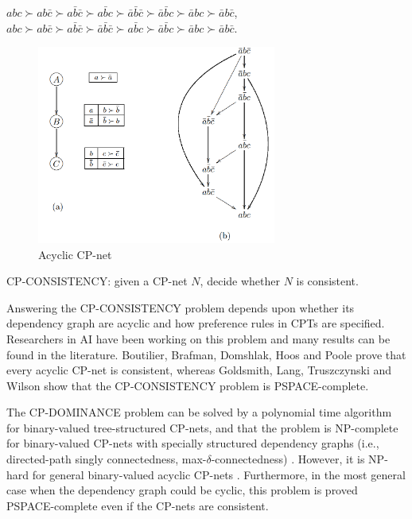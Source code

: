 \begin{center}
	$abc \succ ab\bar{c} \succ a\bar{b}\bar{c} \succ a\bar{b}c \succ \bar{a}\bar{b}\bar{c} 
		\succ \bar{a}\bar{b}c \succ \bar{a}bc \succ \bar{a}b\bar{c}$,\\
	$abc \succ ab\bar{c} \succ a\bar{b}\bar{c} \succ \bar{a}\bar{b}\bar{c} \succ a\bar{b}c
		\succ \bar{a}\bar{b}c \succ \bar{a}bc \succ \bar{a}b\bar{c}$.
\end{center}

\begin{figure}[h!]
  \centering
  \includegraphics[width=0.7\textwidth]{img/acpn.png}
  \caption{Acyclic CP-net \label{fig:cp_net}}
\end{figure}



\begin{definition}
\label{def:con}
  CP-CONSISTENCY: given a CP-net $N$, decide whether 
	$N$ is consistent.
\end{definition}

Answering the CP-CONSISTENCY problem depends upon whether
its dependency graph are acyclic and how preference rules
in CPTs are specified.
Researchers in AI have been working on this problem
and many results can be found in the literature.
Boutilier, Brafman, Domshlak, Hoos and Poole \cite{bbdh03} 
prove that every acyclic CP-net
is consistent, whereas Goldsmith, Lang, Truszczynski and Wilson \cite{Goldsmith} show
that the CP-CONSISTENCY problem is PSPACE-complete.



The CP-DOMINANCE problem can be solved by
a polynomial time algorithm for binary-valued tree-structured
CP-nets, and that the problem is NP-complete for binary-valued
CP-nets with specially structured dependency graphs 
(i.e., directed-path singly connectedness, 
max-$\delta$-connectedness) \cite{bbdh03}.
However, it is NP-hard for general binary-valued acyclic 
CP-nets \cite{bbdh03}.
Furthermore, in the most general case when the dependency graph
could be cyclic, this problem is proved PSPACE-complete even
if the CP-nets are consistent\cite{Goldsmith}.

